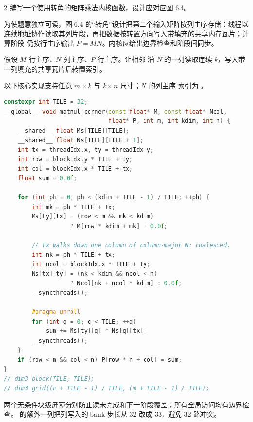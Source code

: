 \begin{solutionexercise}{2}
\problemheading 编写一个使用转角的矩阵乘法内核函数，设计应对应图 6.4。

为使题意独立可读，图 6.4 的“转角”设计把第二个输入矩阵按列主序存储：线程以
连续地址协作读取其列片段，再把数据按转置方向写入带填充的共享内存瓦片；计算阶段
仍按行主序输出 $P=MN$。内核应给出边界检查和阶段间同步。

\approachheading 假设 $M$ 行主序、$N$ 列主序、$P$ 行主序。让相邻 
沿 $N$ 的一列读取连续 $k$，写入带一列填充的共享瓦片后转置索引。

\answerheading 以下核心实现支持任意 $m\times k$ 与 $k\times n$ 尺寸；$N$ 的列主序
索引为 。
\begin{lstlisting}[language=C++]
constexpr int TILE = 32;
__global__ void matmul_corner(const float* M, const float* Ncol,
                              float* P, int m, int kdim, int n) {
    __shared__ float Ms[TILE][TILE];
    __shared__ float Ns[TILE][TILE + 1];
    int tx = threadIdx.x, ty = threadIdx.y;
    int row = blockIdx.y * TILE + ty;
    int col = blockIdx.x * TILE + tx;
    float sum = 0.0f;

    for (int ph = 0; ph < (kdim + TILE - 1) / TILE; ++ph) {
        int mk = ph * TILE + tx;
        Ms[ty][tx] = (row < m && mk < kdim)
                   ? M[row * kdim + mk] : 0.0f;

        // tx walks down one column of column-major N: coalesced.
        int nk = ph * TILE + tx;
        int ncol = blockIdx.x * TILE + ty;
        Ns[tx][ty] = (nk < kdim && ncol < n)
                   ? Ncol[nk + ncol * kdim] : 0.0f;
        __syncthreads();

        #pragma unroll
        for (int q = 0; q < TILE; ++q)
            sum += Ms[ty][q] * Ns[q][tx];
        __syncthreads();
    }
    if (row < m && col < n) P[row * n + col] = sum;
}
// dim3 block(TILE, TILE);
// dim3 grid((n + TILE - 1) / TILE, (m + TILE - 1) / TILE);
\end{lstlisting}
两个无条件块级屏障分别防止读未完成和下一阶段覆盖；所有全局访问均有边界检查。
 的额外一列把列写入的 bank 步长从 32 改成 33，避免 32 路冲突。


\end{solutionexercise}
